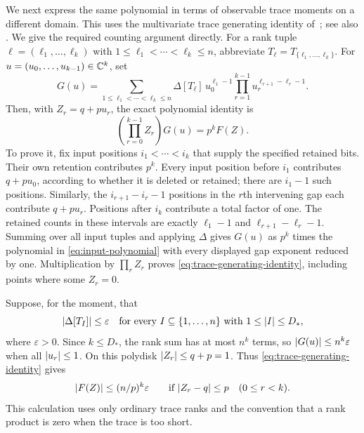 We next express the same polynomial in terms of observable trace
moments on a different domain.  This uses the multivariate trace
generating identity of~\cite[Section~5.2]{CDLSS2021Smoothed}; see also
\cite[Fact~20]{CDLS2024}.  We give the required counting argument
directly.  For a rank tuple
$\ell=(\ell_1,\ldots,\ell_k)$ with
$1\le\ell_1<\cdots<\ell_k\le n$, abbreviate
$T_\ell=T_{\{\ell_1,\ldots,\ell_k\}}$.
For $u=(u_0,\ldots,u_{k-1})\in\mathbb C^k$, set
\[
 G(u)=\sum_{1\le\ell_1<\cdots<\ell_k\le n}
       \Delta[T_\ell]\,
       u_0^{\ell_1-1}
       \prod_{r=1}^{k-1}u_r^{\ell_{r+1}-\ell_r-1}.
\]
Then, with $Z_r=q+pu_r$, the exact polynomial identity is
\begin{equation}
 \left(\prod_{r=0}^{k-1}Z_r\right)G(u)=p^kF(Z).
 \label{eq:trace-generating-identity}
\end{equation}
To prove it, fix input positions $i_1<\cdots<i_k$ that supply the
specified retained bits.  Their own retention contributes $p^k$.
Every input position before $i_1$ contributes $q+pu_0$, according to
whether it is deleted or retained; there are $i_1-1$ such positions.
Similarly, the $i_{r+1}-i_r-1$ positions in the $r$th intervening gap
each contribute $q+pu_r$.  Positions after $i_k$ contribute a total
factor of one.  The retained counts in these intervals are exactly
$\ell_1-1$ and $\ell_{r+1}-\ell_r-1$.  Summing over all input tuples
and applying $\Delta$ gives $G(u)$ as $p^k$ times the polynomial in
\eqref{eq:input-polynomial} with every displayed gap exponent reduced
by one.  Multiplication by $\prod_rZ_r$ proves
\eqref{eq:trace-generating-identity}, including points where some
$Z_r=0$.

Suppose, for the moment, that
\begin{equation}
 \lvert \Delta[T_I]\rvert\le\varepsilon
 \quad\text{for every }I\subseteq\{1,\ldots,n\}
 \text{ with }1\le\lvert I\rvert\le D_*,
 \label{eq:trace-closeness}
\end{equation}
where $\varepsilon>0$.  Since $k\le D_*$, the rank sum has at most
$n^k$ terms, so $\lvert G(u)\rvert\le n^k\varepsilon$ when all
$\lvert u_r\rvert\le1$.  On this polydisk $\lvert Z_r\rvert\le q+p=1$.
Thus \eqref{eq:trace-generating-identity} gives
\begin{equation}
 \lvert F(Z)\rvert\le (n/p)^k\varepsilon
 \qquad\text{if }\lvert Z_r-q\rvert\le p\quad(0\le r<k).
 \label{eq:trace-polydisk-bound}
\end{equation}
This calculation uses only ordinary trace ranks and the convention that
a rank product is zero when the trace is too short.

